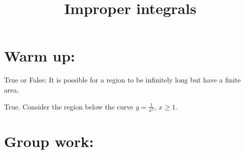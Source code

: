 \documentclass[]{ximera}
\title{Improper integrals}
\begin{document}
\begin{abstract}		\end{abstract}
\maketitle



\section{Warm up:}
True or False:  It is possible for a region to be infinitely long but have a finite area.
	\begin{freeResponse}
	True.  Consider the region below the curve $y=\frac{1}{x^2}$, $x \geq 1$.
	\end{freeResponse}
	
\begin{instructorNotes}

\end{instructorNotes}








\section{Group work:}
\end{document}
